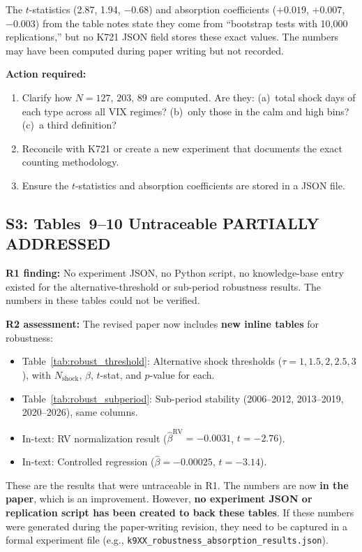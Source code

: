 \documentclass[12pt,a4paper]{article}
\begin{document}
The $t$-statistics (2.87, 1.94, $-0.68$) and absorption coefficients ($+0.019$, $+0.007$, $-0.003$) from the table notes state they come from ``bootstrap tests with 10,000 replications,'' but no K721 JSON field stores these exact values. The numbers may have been computed during paper writing but not recorded.

\textbf{Action required:}
\begin{enumerate}[nosep]
\item Clarify how $N = 127$, $203$, $89$ are computed. Are they: (a)~total shock days of each type across all VIX regimes? (b)~only those in the calm and high bins? (c)~a third definition?
\item Reconcile with K721 or create a new experiment that documents the exact counting methodology.
\item Ensure the $t$-statistics and absorption coefficients are stored in a JSON file.
\end{enumerate}


\subsection*{S3: Tables~9--10 Untraceable \hfill \textcolor{resolved}{PARTIALLY ADDRESSED}}

\textbf{R1 finding:} No experiment JSON, no Python script, no knowledge-base entry existed for the alternative-threshold or sub-period robustness results. The numbers in these tables could not be verified.

\textbf{R2 assessment:} The revised paper now includes \textbf{new inline tables} for robustness:
\begin{itemize}[nosep]
\item Table~\ref{tab:robust_threshold}: Alternative shock thresholds ($\tau = 1, 1.5, 2, 2.5, 3$), with $N_{\text{shock}}$, $\hat{\beta}$, $t$-stat, and $p$-value for each.
\item Table~\ref{tab:robust_subperiod}: Sub-period stability (2006--2012, 2013--2019, 2020--2026), same columns.
\item In-text: RV normalization result ($\hat{\beta}^{\text{RV}} = -0.0031$, $t = -2.76$).
\item In-text: Controlled regression ($\hat{\beta} = -0.00025$, $t = -3.14$).
\end{itemize}

These are the results that were untraceable in R1. The numbers are now \textbf{in the paper}, which is an improvement. However, \textbf{no experiment JSON or replication script has been created to back these tables}. If these numbers were generated during the paper-writing revision, they need to be captured in a formal experiment file (e.g., \texttt{k9XX\_robustness\_absorption\_results.json}).
\end{document}
